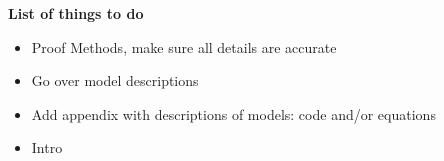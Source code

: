 \textbf{List of things to do}
\begin{itemize}
\item Proof Methods, make sure all details are accurate
\item Go over model descriptions
\item Add appendix with descriptions of models: code and/or equations
\item Intro
\end{itemize}
